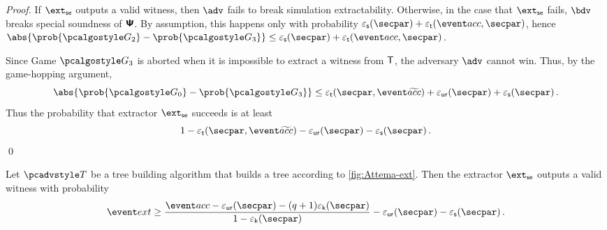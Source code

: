 \begin{proof}
	If $\extse$ outputs a valid witness, then $\adv$ fails to break simulation extractability. Otherwise, in the case that $\extse$ fails, $\bdv$ breaks special soundness of $\bm{\mathsf{\Psi}}$. By assumption, this happens only with probability $\epss(\secpar) + \epst(\accProb, \secpar)$, hence $\abs{\prob{\game{2}} - \prob{\game{3}}} \leq \epss(\secpar) + \epst(\accProb, \secpar)$.
	
	 Since Game $\game{3}$ is aborted when it is impossible to
	extract a witness from $\mathsf{T}$,
	the adversary $\advse$ cannot win. Thus, by the game-hopping argument,
	\[
	\abs{\prob{\game{0}} - \prob{\game{3}}} \leq \epst(\secpar, \waccProb)
		 + \epsur(\secpar) + \epss(\secpar)\,.
	\]
	Thus the probability that extractor $\extse$ succeeds is at least
	\[
	1 - \epst(\secpar, \waccProb) - 
	\epsur(\secpar)
	- \epss(\secpar)\,.
	\]
	\qed
	\end{proof}
	
	\begin{corollary}
		Let $\tdv$ be a tree building algorithm that builds a tree according to \cref{fig:Attema-ext}. Then the extractor $\extse$ outputs a valid witness with probability 
		\begin{equation}
			\label{eq:frk}
			\extProb \geq \frac{\accProb - \epsur(\secpar) - (q + 1) \epsk(\secpar)}{1 - \epsk(\secpar)} 
			- \epsur(\secpar) - \epss(\secpar)\,.
			\end{equation} 
\end{corollary}


